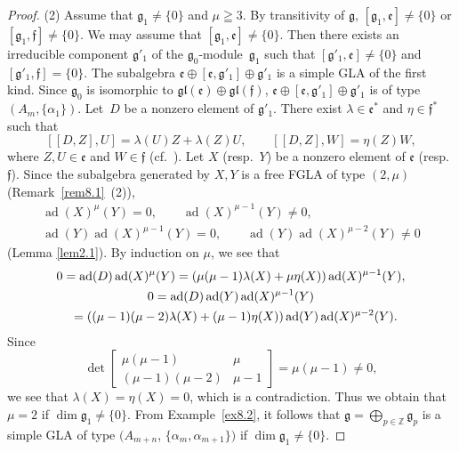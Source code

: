 \documentclass[11pt]{article}
\numberwithin{equation}{section}
\numberwithin{theorem}{section}
\numberwithin{proposition}{section}
\numberwithin{lemma}{section}
\numberwithin{corollary}{section}
\numberwithin{definition}{section}
\numberwithin{example}{section}
\numberwithin{remark}{section}
\numberwithin{note}{section}
\newcommand{\ad}{\operatorname{ad}}
\newcommand{\gla}[1]{\mathfrak#1=\bigoplus\limits_{p\in\mathbb Z}\mathfrak#1_p} \renewcommand{\labelenumi}{{\rm (\arabic{enumi})}}
\begin{document}
\begin{proof}
(2)
Assume that $\mathfrak g_1\ne\{0\}$ and $\mu\geqq3$.
By transitivity of $\mathfrak g$,
$[\mathfrak g_1,\mathfrak e]\ne\{0\}$ or $[\mathfrak g_1,\mathfrak f]\ne\{0\}$.
We may assume that $[\mathfrak g_1,\mathfrak e]\ne\{0\}$.
Then there exists an irreducible component $\mathfrak g'_1$ of
the $\mathfrak g_0$-module~$\mathfrak g_1$
such that $[\mathfrak g'_1,\mathfrak e]\ne\{0\}$ and
$[\mathfrak g'_1,\mathfrak f]=\{0\}$.
The subalgebra $\mathfrak e\oplus[\mathfrak e,\mathfrak g'_1]\oplus
\mathfrak g'_1$ is a simple GLA of the f\/irst kind.
Since $\mathfrak g_0$ is isomorphic to $\mathfrak{gl}(\mathfrak e)\oplus
\mathfrak{gl}(\mathfrak f)$,
$\mathfrak e\oplus[\mathfrak e,\mathfrak g'_1]\oplus \mathfrak g'_1$ is of type $(A_m,\{\alpha_1\})$.
Let~$D$ be a nonzero element of $\mathfrak g'_1$.
There exist $\lambda\in \mathfrak e^*$ and $\eta\in\mathfrak f^*$ such that
\[
[[D,Z],U]=\lambda(U)Z+\lambda(Z)U, \qquad [[D,Z],W]=\eta(Z)W,
\]
where $Z,U\in \mathfrak e$ and $W\in \mathfrak f$
(cf.~\cite[p.~4]{tan57:1}).
Let $X$ (resp.~$Y$) be a nonzero element of $\mathfrak e$
(resp. $\mathfrak f$).
Since the subalgebra generated by $X,Y$ is a free FGLA of type $(2,\mu)$
(Remark~\ref{rem8.1}~(2)),
\begin{gather*}
\ad(X)^\mu(Y)=0, \qquad \ad(X)^{\mu-1}(Y)\ne 0, \\
\ad(Y)\ad(X)^{\mu-1}(Y)=0, \qquad \ad(Y)\ad(X)^{\mu-2}(Y)\ne 0
\end{gather*}
(Lemma \ref{lem2.1}).
By induction on $\mu$, we see that
\begin{gather*}
0  = \ad(D)\ad(X)^\mu(Y)=(\mu(\mu-1)\lambda(X)+\mu\eta(X))\ad(X)^{\mu-1}(Y),
\\
0  = \ad(D)\ad(Y)\ad(X)^{\mu-1}(Y)\\
\hphantom{0}{} =((\mu-1)(\mu-2)\lambda(X)
+(\mu-1)\eta(X))\ad(Y)\ad(X)^{\mu-2}(Y).
\end{gather*}
Since
\[
\det\begin{bmatrix}
\mu(\mu-1) & \mu \\
(\mu-1)(\mu-2) & \mu-1
\end{bmatrix}=
\mu(\mu-1)\ne0,
\]
we see that $\lambda(X)=\eta(X)=0$, which is a contradiction.
Thus we obtain that $\mu=2$ if \mbox{$\dim \mathfrak g_1\ne\{0\}$}.
From Example~\ref{ex8.2}, it follows that
$\gla g$ is a simple GLA of type $(A_{m+n}$, $\{\alpha_m,\alpha_{m+1}\})$
if $\dim \mathfrak g_1\ne\{0\}$.
\end{proof}
\end{document}
